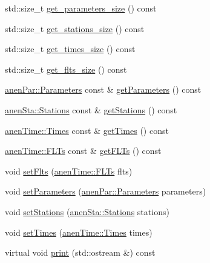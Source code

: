 \begin{DoxyCompactItemize}
\item 
std\+::size\+\_\+t \mbox{\hyperlink{class_forecasts_a445efc69dce930a1c308d17289466e68}{get\+\_\+parameters\+\_\+size}} () const
\item 
std\+::size\+\_\+t \mbox{\hyperlink{class_forecasts_abec05f11da96ef797e741178b2a7335c}{get\+\_\+stations\+\_\+size}} () const
\item 
std\+::size\+\_\+t \mbox{\hyperlink{class_forecasts_a267f33699ada17b57e2c05a25a01d1c3}{get\+\_\+times\+\_\+size}} () const
\item 
std\+::size\+\_\+t \mbox{\hyperlink{class_forecasts_a5cea0e9e7f39a95a26878fefc0c29b7b}{get\+\_\+flts\+\_\+size}} () const
\item 
\mbox{\hyperlink{classanen_par_1_1_parameters}{anen\+Par\+::\+Parameters}} const  \& \mbox{\hyperlink{class_forecasts_a08adfc1510d1a2a506390276dcad8e09}{get\+Parameters}} () const
\item 
\mbox{\hyperlink{classanen_sta_1_1_stations}{anen\+Sta\+::\+Stations}} const  \& \mbox{\hyperlink{class_forecasts_a31978316404dedda6ae3860d7844d855}{get\+Stations}} () const
\item 
\mbox{\hyperlink{classanen_time_1_1_times}{anen\+Time\+::\+Times}} const  \& \mbox{\hyperlink{class_forecasts_ac256fce5eb5e6e773f7f8579bf10c7d7}{get\+Times}} () const
\item 
\mbox{\hyperlink{classanen_time_1_1_f_l_ts}{anen\+Time\+::\+F\+L\+Ts}} const  \& \mbox{\hyperlink{class_forecasts_a3762d8a919986b5874291dfc528303a1}{get\+F\+L\+Ts}} () const
\item 
void \mbox{\hyperlink{class_forecasts_aa15a4e56c5747afc1594131ad30e4fc3}{set\+Flts}} (\mbox{\hyperlink{classanen_time_1_1_f_l_ts}{anen\+Time\+::\+F\+L\+Ts}} flts)
\item 
void \mbox{\hyperlink{class_forecasts_a8dd1f257833a71c72deb3e8d595d607e}{set\+Parameters}} (\mbox{\hyperlink{classanen_par_1_1_parameters}{anen\+Par\+::\+Parameters}} parameters)
\item 
void \mbox{\hyperlink{class_forecasts_aeb1ca08f01a0ff5145607f8e962fb750}{set\+Stations}} (\mbox{\hyperlink{classanen_sta_1_1_stations}{anen\+Sta\+::\+Stations}} stations)
\item 
void \mbox{\hyperlink{class_forecasts_a85263c55dda71ef3363afbd2be337eed}{set\+Times}} (\mbox{\hyperlink{classanen_time_1_1_times}{anen\+Time\+::\+Times}} times)
\item 
virtual void \mbox{\hyperlink{class_forecasts_addb1f75f0dc6833c466453c51256812c}{print}} (std\+::ostream \&) const
\end{DoxyCompactItemize}
